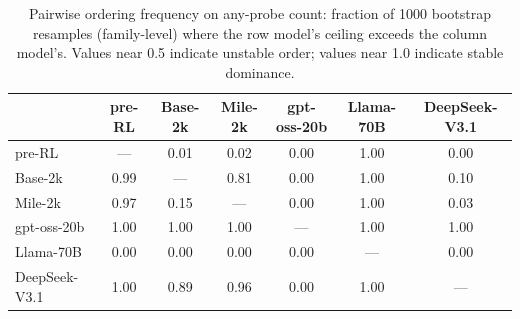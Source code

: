 \begin{table}[h]
\centering
\scriptsize
\caption{Pairwise ordering frequency on any-probe count: fraction of 1000 bootstrap resamples (family-level) where the row model's ceiling exceeds the column model's. Values near 0.5 indicate unstable order; values near 1.0 indicate stable dominance.}
\label{tab:bootstrap_ordering}
\vspace{4pt}
\setlength{\tabcolsep}{4pt}
\begin{tabular}{lcccccc}
\toprule
& pre-RL & Base-2k & Mile-2k & gpt-oss-20b & Llama-70B & DeepSeek-V3.1 \\
\midrule
pre-RL & --- & 0.01 & 0.02 & 0.00 & 1.00 & 0.00 \\
Base-2k & 0.99 & --- & 0.81 & 0.00 & 1.00 & 0.10 \\
Mile-2k & 0.97 & 0.15 & --- & 0.00 & 1.00 & 0.03 \\
gpt-oss-20b & 1.00 & 1.00 & 1.00 & --- & 1.00 & 1.00 \\
Llama-70B & 0.00 & 0.00 & 0.00 & 0.00 & --- & 0.00 \\
DeepSeek-V3.1 & 1.00 & 0.89 & 0.96 & 0.00 & 1.00 & --- \\
\bottomrule
\end{tabular}
\end{table}
